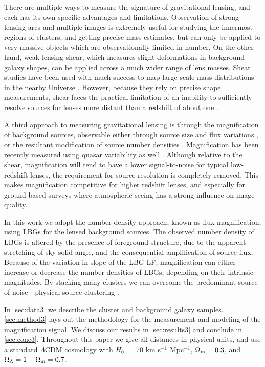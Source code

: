 There are multiple ways to measure the signature of gravitational lensing, and each has its own specific advantages and limitations. Observation of strong lensing arcs and multiple images is extremely useful for studying the innermost regions of clusters, and getting precise mass estimates, but can only be applied to very massive objects which are observationally limited in number. On the other hand, weak lensing shear, which measures slight deformations in background galaxy shapes, can be applied across a much wider range of lens masses. Shear studies have been used with much success to map large scale mass distributions in the nearby Universe \citep{Waerbeke13, Massey07}. However, because they rely on precise shape measurements, shear faces the practical limitation of an inability to sufficiently resolve sources for lenses more distant than a redshift of about one \citep{LHJM10}.

A third approach to measuring gravitational lensing is through the magnification of background sources, observable either through source size and flux variations \citep{Schmidt12,Huff14}, or the resultant modification of source number densities \citep{Ford12, Morrison12, Hildebrandt13, Hildebrandt11, Hildebrandt09b, Scranton05}. Magnification has been recently measured using quasar variability as well \citep{Bauer11}. Although relative to the shear, magnification will tend to have a lower signal-to-noise for typical low-redshift lenses, the requirement for source resolution is completely removed. This makes magnification competitive for higher redshift lenses, and especially for ground based surveys where atmospheric seeing has a strong influence on image quality.

In this work we adopt the number density approach, known as flux magnification, using \ac{LBG}s for the lensed background sources. The observed number density of \ac{LBG}s is altered by the presence of foreground structure, due to the apparent stretching of sky solid angle, and the consequential amplification of source flux. Because of the variation in slope of the \ac{LBG} \ac{LF}, magnification can either increase or decrease the number densities of \ac{LBG}s, depending on their intrinsic magnitudes. By stacking many clusters we can overcome the predominant source of noise - physical source clustering \citep{Hildebrandt11}. 

In \autoref{sec:data3} we describe the cluster and background galaxy samples. \autoref{sec:method3} lays out the methodology for the measurement and modeling of the magnification signal. We discuss our results in \autoref{sec:results3} and conclude in \autoref{sec:conc3}. Throughout this paper we give all distances in physical units, and use a standard $\Lambda$CDM cosmology with $H_0 =$ 70 km s$^{-1}$ Mpc$^{-1}$, $\Omega_{\rm m} = 0.3$, and $\Omega_{\Lambda} = 1 - \Omega_{\rm m} = 0.7$.

